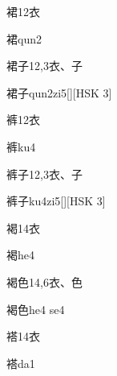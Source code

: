 \begin{Entry}{裙}{12}{⾐}
  \begin{Phonetics}{裙}{qun2}
  \end{Phonetics}
\end{Entry}

\begin{Entry}{裙子}{12,3}{⾐、⼦}
  \begin{Phonetics}{裙子}{qun2zi5}[][HSK 3]
  \end{Phonetics}
\end{Entry}

\begin{Entry}{裤}{12}{⾐}
  \begin{Phonetics}{裤}{ku4}
  \end{Phonetics}
\end{Entry}

\begin{Entry}{裤子}{12,3}{⾐、⼦}
  \begin{Phonetics}{裤子}{ku4zi5}[][HSK 3]
  \end{Phonetics}
\end{Entry}

\begin{Entry}{褐}{14}{⾐}
  \begin{Phonetics}{褐}{he4}
  \end{Phonetics}
\end{Entry}

\begin{Entry}{褐色}{14,6}{⾐、⾊}
  \begin{Phonetics}{褐色}{he4 se4}
  \end{Phonetics}
\end{Entry}

\begin{Entry}{褡}{14}{⾐}
  \begin{Phonetics}{褡}{da1}
  \end{Phonetics}
\end{Entry}


